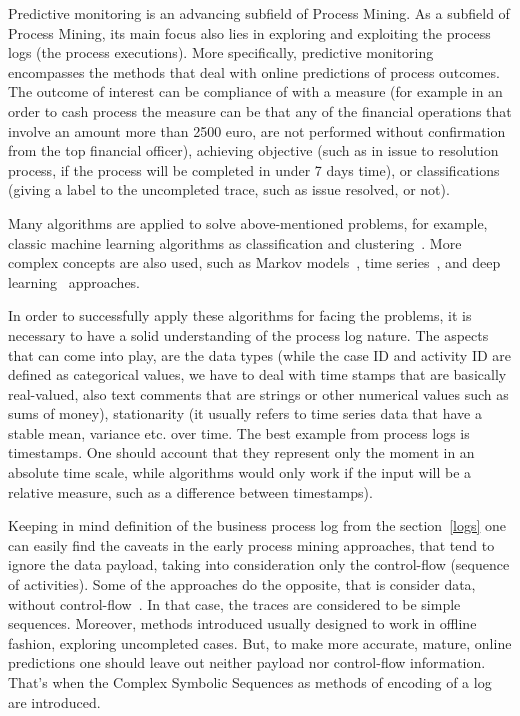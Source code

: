 Predictive monitoring is an advancing subfield of Process Mining. As a subfield of Process Mining, its main focus also lies in exploring and exploiting the process logs (the process executions). More specifically, predictive monitoring encompasses the methods that deal with online predictions of process outcomes. The outcome of interest can be compliance of with a measure (for example in an order to cash process the measure can be that any of the financial operations that involve an amount more than 2500 euro, are not performed without confirmation from the top financial officer), achieving objective (such as in issue to resolution process, if the process will be completed in under 7 days time), or classifications (giving a label to the uncompleted trace, such as issue resolved, or not).  
\par
Many algorithms are applied to solve above-mentioned problems, for example, classic machine learning algorithms as classification and clustering~\cite{Leontjeva2015}. More complex concepts are also used, such as Markov models~\cite{Leontjeva2015}, time series~\cite{Lam20096986}, and deep learning~\cite{niek96732,evermann,quteprints96732} approaches. 
\par
In order to successfully apply these algorithms for facing the problems, it is necessary to have a solid understanding of the process log nature. The aspects that can come into play, are the data types (while the case ID and activity ID are defined as categorical values, we have to deal with time stamps that are basically real-valued, also text comments that are strings or other numerical values such as sums of money), stationarity (it usually refers to time series data that have a stable mean, variance etc. over time. The best example from process logs is timestamps. One should account that they represent only the moment in an absolute time scale, while algorithms would only work if the input will be a relative measure, such as a difference between timestamps). 
\par
Keeping in mind definition of the business process log from the section~\ref{logs} one can easily find the caveats in the early process mining approaches, that tend to ignore the data payload, taking into consideration only the control-flow (sequence of activities). Some of the approaches do the opposite, that is consider data, without control-flow~\cite{vanderAalst2010,DBLP:journals/is/AalstSS11,Schonenberg2008}. In that case, the traces are considered to be simple sequences. Moreover, methods introduced usually designed to work in offline fashion, exploring uncompleted cases. But, to make more accurate, mature, online predictions one should leave out neither payload nor control-flow information. That's when the Complex Symbolic Sequences as methods of encoding of a log are introduced. 


